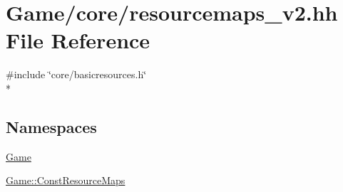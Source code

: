 \hypertarget{resourcemaps__v2_8hh}{\section{Game/core/resourcemaps\-\_\-v2.hh File Reference}
\label{resourcemaps__v2_8hh}
}
{\ttfamily \#include \char`\"{}core/basicresources.\-h\char`\"{}}\\*
\subsection*{Namespaces}
\begin{DoxyCompactItemize}
\item 
\hyperlink{namespaceGame}{Game}
\item 
\hyperlink{namespaceGame_1_1ConstResourceMaps}{Game\-::\-Const\-Resource\-Maps}
\end{DoxyCompactItemize}
